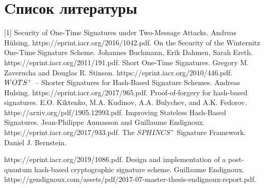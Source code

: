 \documentclass[a4paper, 14pt]{extarticle}
\begin{document}
\section{Cписок литературы}
[1] Security of One-Time Signatures under Two-Message Attacks. Andreas Hülsing. https://eprint.iacr.org/2016/1042.pdf.
\newline
\newline
[2] On the Security of the Winternitz One-Time Signature Scheme. Johannes Buchmann, Erik Dahmen, Sarah Ereth. https://eprint.iacr.org/2011/191.pdf.
\newline
\newline
[3] Short One-Time Signatures. Gregory M. Zaverucha and Douglas R. Stinson. https://eprint.iacr.org/2010/446.pdf.
\newline
\newline
[4] $W\-OTS^{+}$ – Shorter Signatures for Hash-Based Signature Schemes. Andreas Hulsing. https://eprint.iacr.org/2017/965.pdf.
\newline
\newline
[5] Proof-of-forgery for hash-based signatures. E.O. Kiktenko, M.A. Kudinov, A.A. Bulychev, and A.K. Fedorov. https://arxiv.org/pdf/1905.12993.pdf.
\newline
\newline
[6] Improving Stateless Hash-Based Signatures. Jean-Philippe Aumasson and Guillaume Endignoux. https://eprint.iacr.org/2017/933.pdf.
\newline
\newline
[7] The $SPHINCS^{+}$ Signature Framework. Daniel J. Bernstein.

https://eprint.iacr.org/2019/1086.pdf.
\newline
\newline
[8] Design and implementation of a post-quantum
hash-based cryptographic signature scheme. Guillaume Endignoux. https://gendignoux.com/assets/pdf/2017-07-master-thesis-endignoux-report.pdf.
\newpage

\end{document}
